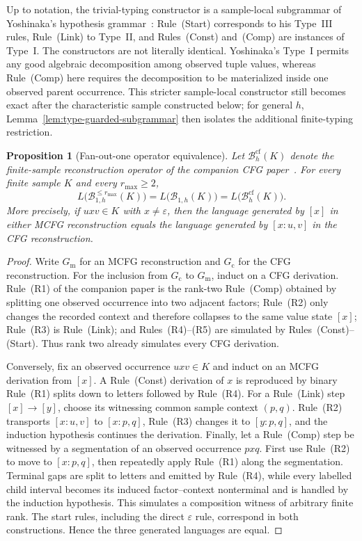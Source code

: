 \documentclass[11pt]{article}
\numberwithin{equation}{section}
\theoremstyle{plain}
\newtheorem{proposition}[theorem]{Proposition}
\theoremstyle{definition}
\theoremstyle{remark}
\newcommand{\eps}{\varepsilon}
\begin{document}
Up to notation, the trivial-typing constructor is a sample-local subgrammar of
Yoshinaka's hypothesis grammar~\cite[Section~4.1]{Yoshinaka2011}: Rule~(Start)
corresponds to his Type~III rules, Rule~(Link) to Type~II, and Rules~(Const)
and~(Comp) are instances of Type~I.  The constructors are not literally
identical.  Yoshinaka's Type~I permits any good algebraic decomposition among
observed tuple values, whereas Rule~(Comp) here requires the decomposition to
be materialized inside one observed parent occurrence.  This stricter
sample-local constructor still becomes exact after the characteristic sample
constructed below; for general $h$, Lemma~\ref{lem:type-guarded-subgrammar}
then isolates the additional finite-typing restriction.

\begin{proposition}[Fan-out-one operator equivalence]
\label{prop:fanout-one-operator}
Let $\mathcal B_h^{\mathrm{cf}}(K)$ denote the finite-sample reconstruction
operator of the companion CFG paper~\cite{kuriyamaCFG}.  For every finite
sample $K$ and every $r_{\max}\ge2$,
\[
 L\bigl(\mathcal B_{1,h}^{\le r_{\max}}(K)\bigr)
 =L\bigl(\mathcal B_{1,h}(K)\bigr)
 =L\bigl(\mathcal B_h^{\mathrm{cf}}(K)\bigr).
\]
More precisely, if $uxv\in K$ with $x\ne\eps$, then the language generated by
$[x]$ in either MCFG reconstruction equals the language generated by
$[x:u,v]$ in the CFG reconstruction.
\end{proposition}

\begin{proof}
Write $G_{\mathrm m}$ for an MCFG reconstruction and $G_{\mathrm c}$ for the
CFG reconstruction.  For the inclusion from $G_{\mathrm c}$ to
$G_{\mathrm m}$, induct on a CFG derivation.  Rule~(R1) of the companion paper
is the rank-two Rule~(Comp) obtained by splitting one observed occurrence into
two adjacent factors; Rule~(R2) only changes the recorded context and therefore
collapses to the same value state $[x]$; Rule~(R3) is Rule~(Link); and
Rules~(R4)--(R5) are simulated by Rules~(Const)--(Start).  Thus rank two already
simulates every CFG derivation.

Conversely, fix an observed occurrence $uxv\in K$ and induct on an MCFG
derivation from $[x]$.  A Rule~(Const) derivation of $x$ is reproduced by
binary Rule~(R1) splits down to letters followed by Rule~(R4).  For a
Rule~(Link) step $[x]\to[y]$, choose its witnessing common sample context
$(p,q)$.  Rule~(R2) transports $[x:u,v]$ to $[x:p,q]$, Rule~(R3) changes it to
$[y:p,q]$, and the induction hypothesis continues the derivation.  Finally,
let a Rule~(Comp) step be witnessed by a segmentation of an observed occurrence
$pxq$.  First use Rule~(R2) to move to $[x:p,q]$, then repeatedly apply
Rule~(R1) along the segmentation.  Terminal gaps are split to letters and
emitted by Rule~(R4), while every labelled child interval becomes its induced
factor--context nonterminal and is handled by the induction hypothesis.  This
simulates a composition witness of arbitrary finite rank.  The start rules,
including the direct $\eps$ rule, correspond in both constructions.  Hence the
three generated languages are equal.
\end{proof}
\end{document}
